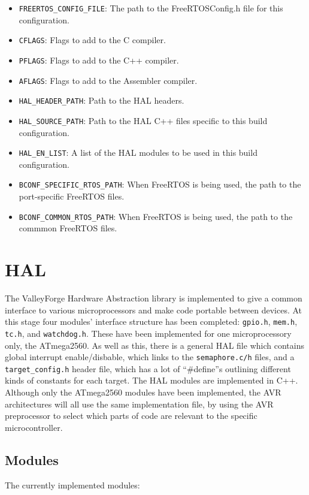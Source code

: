 \documentclass[a4paper, oneside, 11pt, titlepage, onecolumn, openright]{report}
\begin{document}
\begin{itemize}
\item \texttt{FREERTOS\_CONFIG\_FILE}: The path to the FreeRTOSConfig.h file for this configuration.
\item \texttt{CFLAGS}: Flags to add to the C compiler.
\item \texttt{PFLAGS}: Flags to add to the C++ compiler.
\item \texttt{AFLAGS}: Flags to add to the Assembler compiler.
\item \texttt{HAL\_HEADER\_PATH}: Path to the HAL headers.
\item \texttt{HAL\_SOURCE\_PATH}: Path to the HAL C++ files specific to this build configuration.
\item \texttt{HAL\_EN\_LIST}: A list of the HAL modules to be used in this build configuration.
\item \texttt{BCONF\_SPECIFIC\_RTOS\_PATH}: When FreeRTOS is being used, the path to the port-specific FreeRTOS files.
\item \texttt{BCONF\_COMMON\_RTOS\_PATH}: When FreeRTOS is being used, the path to the commmon FreeRTOS files.
\end{itemize}
			
			
\chapter{HAL}
			\label{C:HAL}
			The ValleyForge Hardware Abstraction library is implemented to give a common interface to various microprocessors and make code portable between devices. \newline
			At this stage four modules' interface structure has been completed: \texttt{gpio.h}, \texttt{mem.h}, \texttt{tc.h}, and \texttt{watchdog.h}. These have been implemented for one microprocessory only, the ATmega2560.\newline 
			As well as this, there is a general HAL file which contains global interrupt enable/disbable, which links to the \texttt{semaphore.c/h} files, and a \texttt{target\_config.h} header file, which has a lot of ``\#define''s outlining different kinds of constants for each target.\newline
			The HAL modules are implemented in C++.\newline
			Although only the ATmega2560 modules have been implemented, the AVR architectures will all use the same implementation file, by using the AVR preprocessor to select which parts of code are relevant to the specific microcontroller.
			
\section{Modules}
			\label{s:HALModules}
			The currently implemented modules:
			
\end{document}
